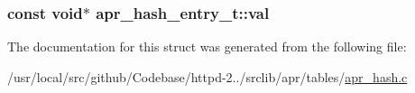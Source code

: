 \subsubsection[{\texorpdfstring{val}{val}}]{\setlength{\rightskip}{0pt plus 5cm}const {\bf void}$\ast$ apr\+\_\+hash\+\_\+entry\+\_\+t\+::val}\hypertarget{structapr__hash__entry__t_ac9510a7b109a9987a5262dce203c021a}{}\label{structapr__hash__entry__t_ac9510a7b109a9987a5262dce203c021a}


The documentation for this struct was generated from the following file\+:\begin{DoxyCompactItemize}
\item 
/usr/local/src/github/\+Codebase/httpd-\/2../srclib/apr/tables/\hyperlink{apr__hash_8c}{apr\+\_\+hash.\+c}\end{DoxyCompactItemize}

